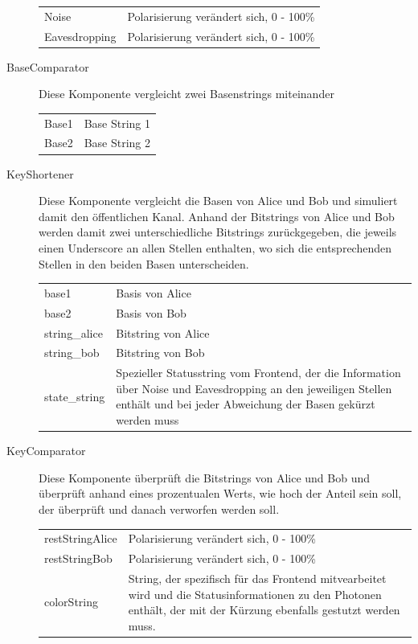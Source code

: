 \documentclass[a4paper,10.2pt,pdftex]{scrartcl}%
\begin{document}
\begin{description}
\begin{tabular}{p{3cm}p{7.5cm}}
Noise  & Polarisierung verändert sich, 0 - 100\% \\
Eavesdropping & Polarisierung verändert sich, 0 - 100\% \\
\end{tabular} 
\item[BaseComparator] Diese Komponente vergleicht zwei Basenstrings miteinander \\  \begin{tabular}{p{3cm}p{9cm}}
Base1 & Base String 1   \\
Base2 & Base String 2  
\end{tabular}
\item[KeyShortener] 
Diese Komponente vergleicht die Basen von Alice und Bob und simuliert damit den öffentlichen Kanal. Anhand der Bitstrings von Alice und Bob werden damit zwei unterschiedliche Bitstrings zurückgegeben, die jeweils einen Underscore an allen Stellen enthalten, wo sich die entsprechenden Stellen in den beiden Basen unterscheiden. 
\\
\begin{tabular}{p{3cm}p{7.5cm}}
base1  & Basis von Alice \\
base2  & Basis von Bob \\
string\_alice &  Bitstring von Alice \\
string\_bob & Bitstring von Bob \\ 
state\_string & Spezieller Statusstring vom Frontend, der die Information über Noise und Eavesdropping an den jeweiligen Stellen enthält und bei jeder Abweichung der Basen gekürzt werden muss \\
\end{tabular} 
\item[KeyComparator] 
Diese Komponente überprüft die Bitstrings von Alice und Bob und überprüft anhand eines prozentualen Werts, wie hoch der Anteil sein soll, der überprüft und danach verworfen werden soll. \\
\begin{tabular}{p{3cm}p{7.5cm}}
restStringAlice  & Polarisierung verändert sich, 0 - 100\% \\
restStringBob & Polarisierung verändert sich, 0 - 100\% \\
colorString & String, der spezifisch für das Frontend mitvearbeitet wird und die Statusinformationen zu den Photonen enthält, der mit der Kürzung ebenfalls gestutzt werden muss. 
\end{tabular} 
\end{description}
\end{document}

